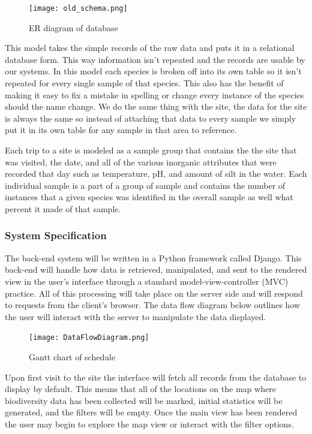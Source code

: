 \begin{figure}[h]
	\centering
	\texttt{[image: old\_schema.png]}
	\captionsetup{justification=centering}
	\caption{
		ER diagram of database
	}
	\label{fig:old_schema}
\end{figure}

This model takes the simple records of the raw data and puts it in a relational database form.
This way information isn’t repeated and the records are usable by our systems.
In this model each species is broken off into its own table so it isn’t repeated for every single sample of that species.
This also has the benefit of making it easy to fix a mistake in spelling or change every instance of the species should the name change.
We do the same thing with the site, the data for the site is always the same so instead of attaching that data to every sample we simply put it in its own table for any sample in that area to reference.

Each trip to a site is modeled as a sample group that contains the the site that was visited, the date, and all of the various inorganic attributes that were recorded that day such as temperature, pH, and amount of silt in the water.
Each individual sample is a part of a group of sample and contains the number of instances that a given species was identified in the overall sample as well what percent it made of that sample.

\subsubsection{System Specification}
The back-end system will be written in a Python framework called Django. This back-end will handle how data is retrieved, manipulated, and sent to the rendered view in the user’s interface through a standard model-view-controller (MVC) practice. All of this processing will take place on the server side and will respond to requests from the client’s browser. The data flow diagram below outlines how the user will interact with the server to manipulate the data displayed.

\begin{figure}[h]
	\centering
	\texttt{[image: DataFlowDiagram.png]}
	\captionsetup{justification=centering}
	\caption{
		Gantt chart of schedule
	}
	\label{fig:data_flow}
\end{figure}

Upon first visit to the site the interface will fetch all records from the database to display by default. This means that all of the locations on the map where biodiversity data has been collected will be marked, initial statistics will be generated, and the filters will be empty. Once the main view has been rendered the user may begin to explore the map view or interact with the filter options.

